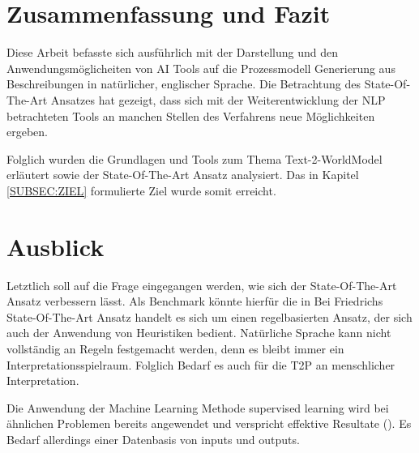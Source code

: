 \section{Zusammenfassung und Fazit}
Diese Arbeit befasste sich ausführlich mit der Darstellung und den Anwendungsmöglicheiten von \ac{AI} Tools auf die Prozessmodell Generierung aus Beschreibungen in natürlicher, englischer Sprache. 
Die Betrachtung des State-Of-The-Art Ansatzes hat gezeigt, dass sich mit der Weiterentwicklung der \ac{NLP} betrachteten Tools an manchen Stellen des Verfahrens neue Möglichkeiten ergeben.\par
Folglich wurden die Grundlagen und Tools zum Thema Text-2-WorldModel erläutert sowie der State-Of-The-Art Ansatz analysiert. Das in Kapitel \ref{SUBSEC:ZIEL} formulierte Ziel wurde somit erreicht.

\section{Ausblick}
Letztlich soll auf die Frage eingegangen werden, wie sich der State-Of-The-Art Ansatz verbessern lässt. Als Benchmark könnte hierfür die in   Bei Friedrichs State-Of-The-Art Ansatz handelt es sich um einen regelbasierten Ansatz, der sich auch der Anwendung von Heuristiken bedient. Natürliche Sprache kann nicht vollständig an Regeln festgemacht werden, denn es bleibt immer ein Interpretationsspielraum. Folglich Bedarf es auch für die \ac{T2P} an menschlicher Interpretation. \par
Die Anwendung der Machine Learning Methode supervised learning wird bei ähnlichen Problemen bereits angewendet und verspricht effektive Resultate (\cite[vgl.][2]{BPMML}). Es Bedarf allerdings einer Datenbasis von inputs und outputs.